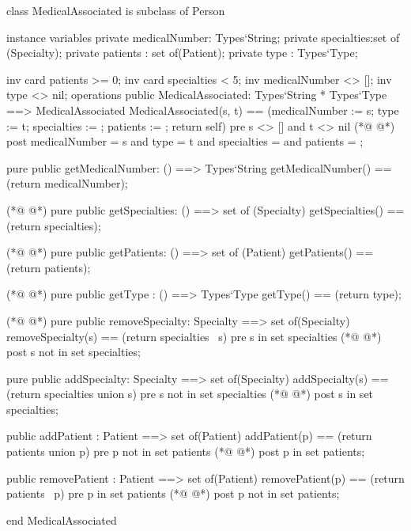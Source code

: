 \begin{vdmpp}[breaklines=true]
class MedicalAssociated is subclass of Person

instance variables
  private medicalNumber: Types`String;
  private specialties:set of (Specialty);
  private patients : set of(Patient);
 private type : Types`Type;
 
 inv card patients >= 0;
  inv card specialties < 5;
 inv medicalNumber <> [];
 inv type <> nil;
operations
 public MedicalAssociated: Types`String * Types`Type ==> MedicalAssociated
  MedicalAssociated(s, t) == (medicalNumber := s; type := t; specialties := {}; patients := {}; return self)
 pre s <> [] and t <> nil
(*@
\label{MedicalAssociated:17}
@*)
 post medicalNumber = s and type = t and specialties = {} and patients = {};
 
 pure public getMedicalNumber: () ==> Types`String
  getMedicalNumber() == (return medicalNumber);
 
(*@
\label{getMedicalNumber:22}
@*)
 pure public getSpecialties: () ==> set of (Specialty)
  getSpecialties() == (return specialties);
 
(*@
\label{getSpecialties:25}
@*)
 pure public getPatients: () ==> set of (Patient)
  getPatients() == (return patients);
  
(*@
\label{getPatients:28}
@*)
 pure public getType : () ==> Types`Type
  getType() == (return type);
  
(*@
\label{getType:31}
@*)
 pure public removeSpecialty: Specialty ==> set of(Specialty)
  removeSpecialty(s) == (return specialties \ {s})
 pre s in set specialties
(*@
\label{removeSpecialty:34}
@*)
 post s not in set specialties;
  
 pure public addSpecialty: Specialty ==> set of(Specialty)
  addSpecialty(s) == (return specialties union {s})
 pre s not in set specialties
(*@
\label{addSpecialty:39}
@*)
 post s in set specialties;
 
 public addPatient : Patient ==> set of(Patient)
  addPatient(p) == (return patients union {p})
 pre p not in set patients
(*@
\label{addPatient:44}
@*)
 post p in set patients;
 
 public removePatient : Patient ==> set of(Patient)
  removePatient(p) == (return patients \ {p})
 pre p in set patients
(*@
\label{removePatient:49}
@*)
 post p not in set patients;

end MedicalAssociated
\end{vdmpp}
